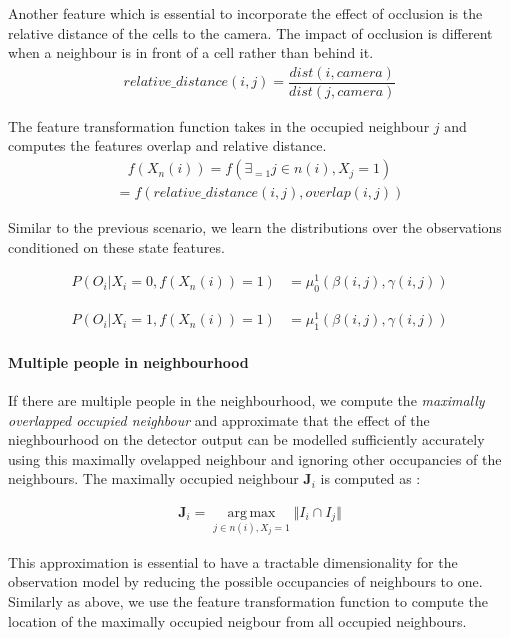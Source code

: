 \documentclass[10pt,twocolumn,letterpaper]{article}
\begin{document}
Another feature which is essential to incorporate the effect of occlusion is the relative distance of the cells to the camera. 
The impact of occlusion is different when a neighbour is in front of a cell rather than behind it. 
\begin{align}
relative\_ distance(i,j) = \dfrac{dist(i,camera)}{dist(j,camera)}
\end{align}

The feature transformation function takes in the occupied neighbour $j$ and computes the features overlap and relative distance.
\begin{align}
f(X_n(i)) = f(\exists_{=1} j \in{n(i)},X_{j} =1)
\end{align}
\begin{align}
= f(relative\_ distance(i,j),overlap(i,j))
\end{align}


Similar to the previous scenario, we learn the distributions over the observations conditioned on these state features.

\begin{align}
 P(O_{i} |X_{i}=0 ,f(X_n(i))=1 )  &=\mu^{1}_{0}(\beta(i,j),\gamma(i,j))
\end{align}

\begin{align}
 P(O_{i} |X_{i}=1 ,f(X_n(i))=1 )  &=\mu^{1}_{1}(\beta(i,j),\gamma(i,j))
\end{align}


\paragraph{Multiple people in neighbourhood}
If there are multiple people in the neighbourhood, we compute the \textit{maximally overlapped occupied neighbour} and approximate that the effect of the nieghbourhood on the detector output can be modelled sufficiently accurately using this maximally ovelapped neighbour and ignoring other occupancies of the neighbours. The maximally occupied neighbour $ \textbf{J}_{i} $ is computed as :

\begin{align}
 \textbf{J}_{i} = \operatorname*{arg\,max}_{j\in n(i),X_{j}=1} \Vert I_{i}\cap I_{j} \Vert  
\end{align}

This approximation is essential to have a tractable dimensionality for the observation model by reducing the possible occupancies of neighbours to one. 
Similarly as above, we use the feature transformation function to compute the location of the maximally occupied neigbour from all occupied neighbours.
\end{document}
